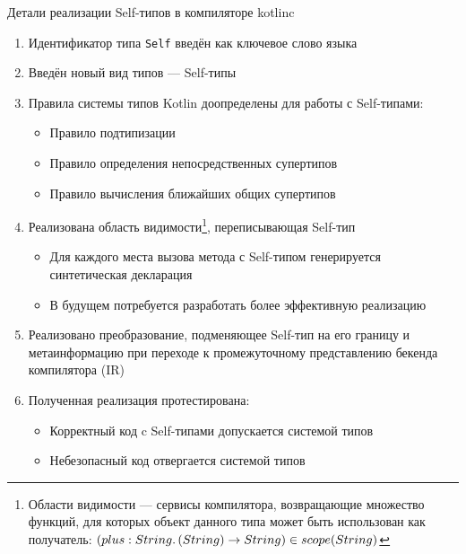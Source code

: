 \documentclass[usenames, dvipsnames]{beamer}
\begin{document}
    \begin{frame}{Детали реализации Self-типов в компиляторе kotlinc}
        \begin{enumerate}
            \item Идентификатор типа \texttt{Self} введён как ключевое слово языка
            \item Введён новый вид типов --- Self-типы
            \item Правила системы типов Kotlin доопределены для работы с Self-типами:
            \begin{itemize}
                \item Правило подтипизации
                \item Правило определения непосредственных супертипов
                \item Правило вычисления ближайших общих супертипов
            \end{itemize}
            \item Реализована область видимости\footnote{Области видимости --- сервисы компилятора, возвращающие множество функций, для которых объект данного типа может быть использован как получатель: $(plus : String\ldotp(String) \to String) \in scope(String)$}, переписывающая Self-тип
            \begin{itemize}
                \item Для каждого места вызова метода с Self-типом генерируется синтетическая декларация
                \item В будущем потребуется разработать более эффективную реализацию
            \end{itemize}
            \item Реализовано преобразование, подменяющее Self-тип на его границу и метаинформацию при переходе к промежуточному представлению бекенда компилятора (IR)
            \item Полученная реализация протестирована:
            \begin{itemize}
                \item Корректный код c Self-типами допускается системой типов
                \item Небезопасный код отвергается системой типов
            \end{itemize}
        \end{enumerate}
    \end{frame}
\end{document}
